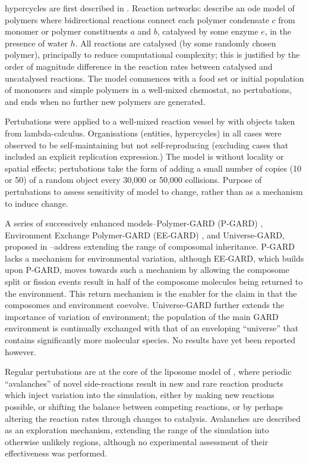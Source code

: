 \Glspl{hypercycle} are first described in \textcite{Eigen1977}. Reaction networks: \textcite{Farmer1986} describe an \gls{ode} model of polymers where bidirectional reactions connect each polymer condensate $c$ from monomer or polymer constituents $a$ and $b$, catalysed by some enzyme $e$, in the presence of water $h$. All reactions are catalysed (by some randomly chosen polymer), principally to reduce computational complexity; this is justified by the order of magnitude difference in the reaction rates between catalysed and uncatalysed reactions.  The model commences with a food set or initial population of monomers and simple polymers in a well-mixed chemostat, no pertubations, and ends when no further new polymers are generated.

Pertubations were applied to a well-mixed reaction vessel by \textcite{Fontana1994a} with objects taken from lambda-calculus. Organisations (entities, \glspl{hypercycle}) in all cases were observed to be self-maintaining but not self-reproducing (excluding cases that included an explicit replication expression.) The model is without locality or spatial effects; pertubations take the form of adding a small number of copies (10 or 50) of a random object every 30,000 or 50,000 collisions. Purpose of pertubations to assess sensitivity of model to change, rather than as a mechanism to induce change. 

A series of successively enhanced models--Polymer-GARD (P-GARD) \parencite{Shenhav2005}, Environment Exchange Polymer-GARD (EE-GARD) \parencite{Shenhav2007}, and Universe-GARD, proposed in \cite{Markovitch2012}--address extending the range of composomal inheritance. P-GARD lacks a mechanism for environmental variation, although EE-GARD, which builds upon P-GARD, moves towards such a mechanism by allowing the composome split or fission events result in half of the composome molecules being returned to the environment. This return mechanism is the enabler for the claim in \textcite[p1819]{Shenhav2007} that the composomes and environment coevolve. Universe-GARD further extends the importance of variation of environment; the population of the main GARD environment is continually exchanged with that of an enveloping ``universe'' that contains significantly more molecular species. No results have yet been reported however.

Regular pertubations are at the core of the liposome model of \textcite{Fernando:2007pf}, where periodic ``avalanches'' of novel side-reactions result in new and rare reaction products which inject variation into the simulation, either by making new reactions possible, or shifting the balance between competing reactions, or by perhaps altering the reaction rates through changes to catalysis. Avalanches are described as an exploration mechanism, extending the range of the simulation into otherwise unlikely regions, although no experimental assessment of their effectiveness was performed.

